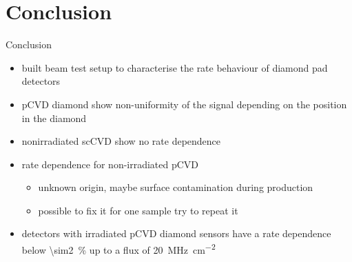 \section{Conclusion}
\begin{frame}{Conclusion}

	\begin{minipage}[c][.55\textheight]{\textwidth}
		\begin{itemize}
			\itemfill
			\item built beam test setup to characterise the rate behaviour of diamond pad detectors
			\item pCVD diamond show non-uniformity of the signal depending on the position in the diamond
			\item nonirradiated scCVD show no rate dependence
			\item rate dependence for non-irradiated pCVD
			\begin{itemize}
				\item unknown origin, maybe surface contamination during production
				\item possible to fix it for one sample \ra try to repeat it\vspace*{5pt}
			\end{itemize}
			\item detectors with irradiated pCVD diamond sensors have a rate dependence below \SI{\sim2}{\%} up to a flux of \SI{20}{\mega\hertz\per \centi\meter^2}
		\end{itemize}
	\end{minipage}
	
\end{frame}

